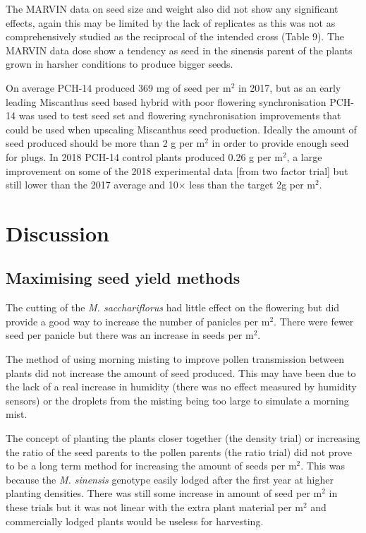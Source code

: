 \documentclass[fleqn, 15pt, lineno]{olplainarticle}
\begin{document}
The MARVIN data on seed size and weight also did not show any significant effects, again this may be limited by the lack of replicates as this was not as comprehensively studied as the reciprocal of the intended cross (Table 9).
The MARVIN data dose show a tendency as seed in the sinensis parent of the plants grown in harsher conditions to produce bigger seeds.

On average PCH-14 produced 369 mg of seed per m$^2$ in 2017, but as an early leading Miscanthus seed based hybrid with poor flowering synchronisation PCH-14 was used to test seed set and flowering synchronisation improvements that could be used when upscaling Miscanthus seed production.
Ideally the amount of seed produced should be more than 2 g per m$^2$ in order to provide enough seed for plugs.
In 2018 PCH-14 control plants produced 0.26 g per m$^2$, a large improvement on some of the 2018 experimental data [from two factor trial] but still lower than the 2017 average and 10$\times$ less than the target 2g per m$^2$.



\FloatBarrier
\section{Discussion}


\FloatBarrier
\subsection{Maximising seed yield methods}
The cutting of the \textit{M. sacchariflorus} had little effect on the flowering but did provide a good way to increase the number of panicles per m$^2$.
There were fewer seed per panicle but there was an increase in seeds per m$^2$.

The method of using morning misting to improve pollen transmission between plants did not increase the amount of seed produced.
This may have been due to the lack of a real increase in humidity (there was no effect measured by humidity sensors) or the droplets from the misting being too large to simulate a morning mist.

The concept of planting the plants closer together (the density trial) or increasing the ratio of the seed parents to the pollen parents (the ratio trial) did not prove to be a long term method for increasing the amount of seeds per m$^2$.
This was because the \textit{M. sinensis} genotype easily lodged after the first year at higher planting densities.
There was still some increase in amount of seed per m$^2$ in these trials but it was not linear with the extra plant material per m$^2$ and commercially lodged plants would be useless for harvesting.
\end{document}
